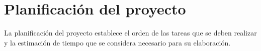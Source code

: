

\chapter{Planificación del proyecto}
\thispagestyle{chapterpage}

La planificación del proyecto establece el orden de las tareas que 
se deben realizar y la estimación de tiempo que se considera necesario 
para su elaboración. 






